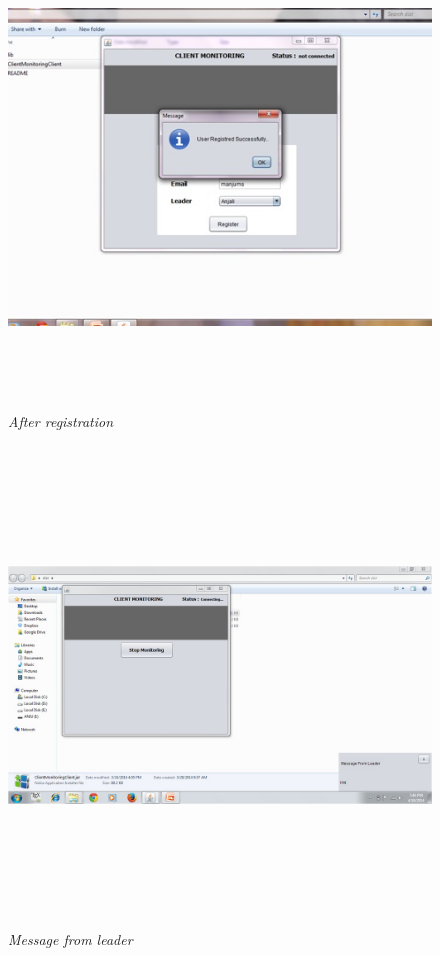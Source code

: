 \begin{figure}[h!]
\centering
\includegraphics[height=5in, width = 5in]{second.jpg}
\caption{\emph{After registration}}
\label{fig:1}
\end{figure}



\begin{figure}[h!]
\centering
\includegraphics[height=5in, width = 5in]{le.jpg}
\caption{\emph{Message from leader}}
\label{fig:1}
\end{figure}
